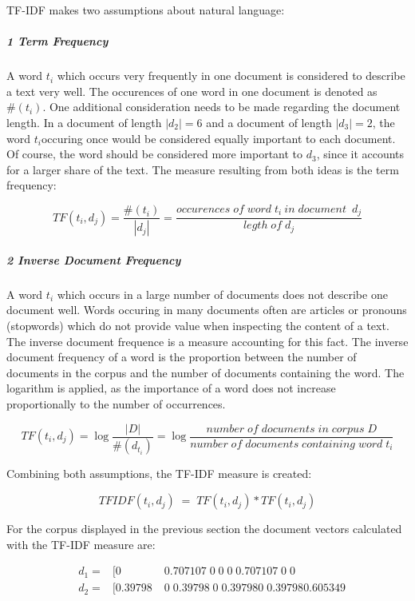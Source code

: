             \ac{TF-IDF} makes two assumptions about natural language:
            
            \subparagraph{1 Term Frequency}
            
            A word $t_{i} $ which occurs very frequently in one document is considered to describe a text very well. The occurences of one word in one document is denoted as $ \#( t_{i}) $.
            One additional consideration needs to be made regarding the document length. In a document of length $ |d_{2}| = 6 $ and a document of length  $ |d_{3}| = 2 $, the word $ t_{i} $occuring once would be considered equally important to each document. Of course, the word should be considered more important to $ d_{3} $, since it accounts for a larger share of the text. The measure resulting from both ideas is the term frequency:
            
            \[ TF(t_{i}, d_{j}) =   \dfrac{\#( t_{i})}{|d_{j}|} = \dfrac{occurences \; of \; word \; t_{i} \: in \; document \;\:   d_{j}}{legth \; of \; d_{j}} \]
            
            \subparagraph{2 Inverse Document Frequency}
            A word $t_{i} $ which occurs in a large number of documents does not describe one document well. Words occuring in many documents often are articles or pronouns (stopwords) which do not provide value when inspecting the content of a text. The inverse document frequence is a measure accounting for this fact. The inverse document frequency of a word is the proportion between the number of documents in the corpus and the number of documents containing the word. The logarithm is applied, as the importance of a word does not increase proportionally to the number of occurrences.
        
            
            \[ TF(t_{i}, d_{j}) = \log \dfrac{|D|}{\#(d_{t_{i}}) } =  \log \dfrac{number \;  of\;  documents \;  in \; corpus \; D}{ number \; of \; documents \; containing \; word \; t_{i}} \]
            
            Combining both assumptions, the \ac{TF-IDF} measure is created:
            
            \[ TFIDF(t_{i}, d_{j}) \;=\; TF(t_{i}, d_{j}) * TF(t_{i}, d_{j})\]
            
            For the corpus displayed in the previous section the document vectors calculated with the \ac{TF-IDF} measure are:
            
                    
            \begin{align}
                &d_1 = & [ 0\;	&0.707107\;	0\;	0\;	0\;	0.707107\;	0\;	0 \\
                &d_2 = & [ 0.39798\;	&0\;	0.39798\;	0\;	0.39798	0\;	0.39798	0.605349 
            \end{align}
                
